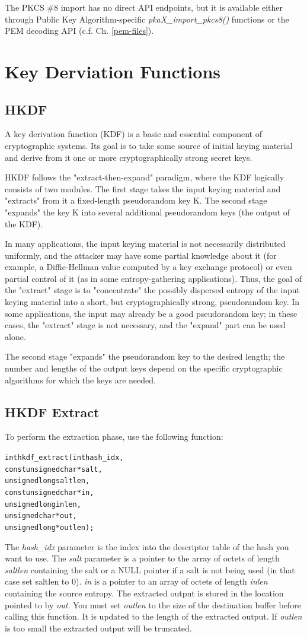 \documentclass[synpaper]{book}
\newcommand{\mysection}[1]    %
	{                   %
	\section{#1}
   \markboth{\textsf{www.libtom.net}}{\thesection ~ {#1}}
	}
\begin{document}
The PKCS \#8 import has no direct API endpoints, but it is available either through Public Key Algorithm-specific
\textit{pkaX\_import\_pkcs8()} functions or the PEM decoding API (c.f. Ch. \ref{pem-files}).


\mysection{Key Derviation Functions}
\subsection{HKDF}
A key derivation function (KDF) is a basic and essential component of cryptographic systems.  Its goal is to take some source of initial
keying material and derive from it one or more cryptographically strong secret keys.

HKDF follows the "extract-then-expand" paradigm, where the KDF logically consists of two modules.  The first stage takes the input
keying material and "extracts" from it a fixed-length pseudorandom key K.  The second stage "expands" the key K into several additional
pseudorandom keys (the output of the KDF).

In many applications, the input keying material is not necessarily distributed uniformly, and the attacker may have some partial
knowledge about it (for example, a Diffie-Hellman value computed by a key exchange protocol) or even partial control of it (as in some
entropy-gathering applications).  Thus, the goal of the "extract" stage is to "concentrate" the possibly dispersed entropy of the input
keying material into a short, but cryptographically strong, pseudorandom key.  In some applications, the input may already be a
good pseudorandom key; in these cases, the "extract" stage is not necessary, and the "expand" part can be used alone.

The second stage "expands" the pseudorandom key to the desired length; the number and lengths of the output keys depend on the
specific cryptographic algorithms for which the keys are needed.

\subsection{HKDF Extract}
To perform the extraction phase, use the following function:

\begin{alltt}
int hkdf_extract(   int  hash_idx,
    const unsigned char *salt,
          unsigned long  saltlen,
    const unsigned char *in,
          unsigned long  inlen,
          unsigned char *out,
          unsigned long *outlen);
\end{alltt}
The \textit{hash\_idx} parameter is the index into the descriptor table of the hash you want to use.
The \textit{salt} parameter is a pointer to the array of octets of length \textit{saltlen} containing the salt or a NULL pointer if a salt is not being used (in that case set saltlen to 0).
\textit{in} is a pointer to an array of octets of length \textit{inlen} containing the source entropy.  The extracted output is stored in the location pointed to by \textit{out}.
You must set \textit{outlen} to the size of the destination buffer before calling this function. It is updated to the length of the extracted output. If \textit{outlen} is too small the extracted output will be truncated.
\end{document}
